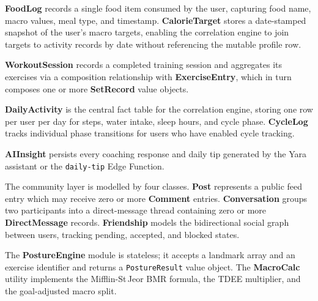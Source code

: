 \textbf{FoodLog} records a single food item consumed by the user,
capturing food name, macro values, meal type, and timestamp.
\textbf{CalorieTarget} stores a date-stamped snapshot of the user's
macro targets, enabling the correlation engine to join targets to
activity records by date without referencing the mutable profile row.

\textbf{WorkoutSession} records a completed training session and
aggregates its exercises via a composition relationship with
\textbf{ExerciseEntry}, which in turn composes one or more
\textbf{SetRecord} value objects.

\textbf{DailyActivity} is the central fact table for the correlation
engine, storing one row per user per day for steps, water intake,
sleep hours, and cycle phase. \textbf{CycleLog} tracks individual
phase transitions for users who have enabled cycle tracking.

\textbf{AIInsight} persists every coaching response and daily tip
generated by the Yara assistant or the \texttt{daily-tip} Edge
Function.

The community layer is modelled by four classes. \textbf{Post}
represents a public feed entry which may receive zero or more
\textbf{Comment} entries. \textbf{Conversation} groups two
participants into a direct-message thread containing zero or more
\textbf{DirectMessage} records. \textbf{Friendship} models the
bidirectional social graph between users, tracking pending, accepted,
and blocked states.

The \textbf{PostureEngine} module is stateless; it accepts a landmark
array and an exercise identifier and returns a
\texttt{PostureResult} value object. The \textbf{MacroCalc} utility
implements the Mifflin-St\,Jeor BMR formula, the TDEE multiplier, and
the goal-adjusted macro split.

